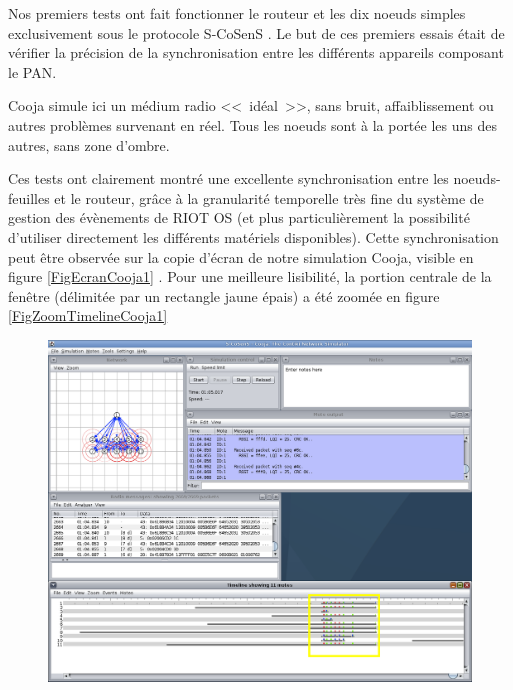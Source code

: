 \newcommand{\nodeid}[1]{\textsf{#1}}


Nos premiers tests ont fait fonctionner le routeur et les dix noeuds simples
exclusivement sous le protocole S-CoSenS \cite{KR-SENSORNETS-2015}. Le but
de ces premiers essais était de vérifier la précision de la synchronisation
entre les différents appareils composant le PAN.

Cooja simule ici un médium radio <<~idéal~>>, sans bruit, affaiblissement
ou autres problèmes survenant en réel. Tous les noeuds sont à la portée
les uns des autres, sans zone d'ombre.

Ces tests ont clairement montré une excellente synchronisation entre les
noeuds-feuilles et le routeur, grâce à la granularité temporelle très fine
du système de gestion des évènements de RIOT OS (et plus particulièrement
la possibilité d'utiliser directement les différents  matériels
disponibles). Cette synchronisation peut être observée sur la copie d'écran
de notre simulation Cooja, visible en figure \vref{FigEcranCooja1}
\footnotemark[1].
Pour une meilleure lisibilité, la portion centrale de la fenêtre
 (délimitée par un rectangle jaune épais) a été zoomée
en figure \vref{FigZoomTimelineCooja1}



\begin{figure}[!p]
\raggedright
\begin{sideways}
\includegraphics[width=17.4cm]{images/ch5-s-cosens-cooja-1.png}
\end{sideways}
\label{FigEcranCooja1}
\end{figure}


